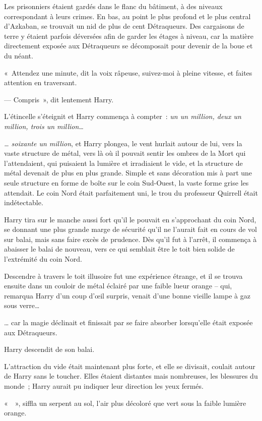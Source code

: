 Les prisonniers étaient gardés dans le flanc du bâtiment, à des niveaux correspondant à leurs crimes. En bas, au point le plus profond et le plus central d'Azkaban, se trouvait un nid de plus de cent Détraqueurs. Des cargaisons de terre y étaient parfois déversées afin de garder les étages à niveau, car la matière directement exposée aux Détraqueurs se décomposait pour devenir de la boue et du néant.

«~Attendez une minute, dit la voix râpeuse, suivez-moi à pleine vitesse, et faites attention en traversant.

--- Compris~», dit lentement Harry.

L'étincelle s'éteignit et Harry commença à compter~: \emph{un un million, deux un million, trois un million…}

\emph{… soixante un million}, et Harry plongea, le vent hurlait autour de lui, vers la vaste structure de métal, vers là où il pouvait sentir les ombres de la Mort qui l'attendaient, qui puisaient la lumière et irradiaient le vide, et la structure de métal devenait de plus en plus grande. Simple et sans décoration mis à part une seule structure en forme de boîte sur le coin Sud-Ouest, la vaste forme grise les attendait. Le coin Nord était parfaitement uni, le trou du professeur Quirrell était indétectable.

Harry tira sur le manche aussi fort qu'il le pouvait en s'approchant du coin Nord, se donnant une plus grande marge de sécurité qu'il ne l'aurait fait en cours de vol sur balai, mais sans faire excès de prudence. Dès qu'il fut à l'arrêt, il commença à abaisser le balai de nouveau, vers ce qui semblait être le toit bien solide de l'extrémité du coin Nord.

Descendre à travers le toit illusoire fut une expérience étrange, et il se trouva ensuite dans un couloir de métal éclairé par une faible lueur orange -- qui, remarqua Harry d'un coup d'œil surpris, venait d'une bonne vieille lampe à gaz sous verre…

… car la magie déclinait et finissait par se faire absorber lorsqu'elle était exposée aux Détraqueurs.

Harry descendit de son balai.

L'attraction du vide était maintenant plus forte, et elle se divisait, coulait autour de Harry sans le toucher. Elles étaient distantes mais nombreuses, les blessures du monde~; Harry aurait pu indiquer leur direction les yeux fermés.

«~~», siffla un serpent au sol, l'air plus décoloré que vert sous la faible lumière orange.

